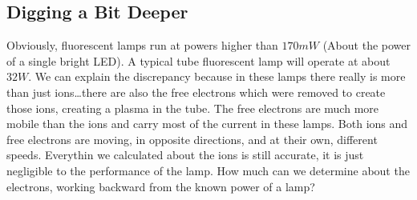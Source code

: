 \documentclass[11pt, letterpaper]{memoir}
\begin{document}
\subsection*{Digging a Bit Deeper}
Obviously, fluorescent lamps run at powers higher than $170 mW$ (About the power of a single bright LED). A typical tube fluorescent lamp will operate at about $32W$. We can explain the discrepancy because in these lamps there really is more than just  ions\ldots there are also the free electrons which were removed to create those ions, creating a plasma in the tube. The free electrons are much more mobile than the  ions and carry most of the current in these lamps. Both ions and free electrons are moving, in opposite directions, and at their own, different speeds. Everythin we calculated about the ions is still accurate, it is just negligible to the performance of the lamp. How much can we determine about the electrons, working backward from the known power of a lamp?
\end{document}
